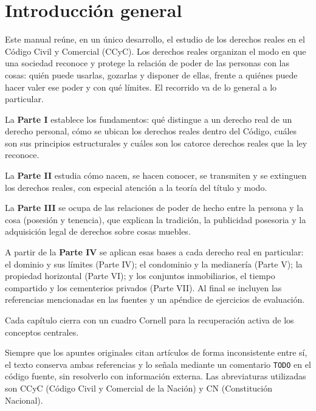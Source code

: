 \documentclass[12pt,oneside]{book}
\begin{document}
\mainmatter

\chapter*{Introducción general}

Este manual reúne, en un único desarrollo, el estudio de los derechos reales en el Código Civil y Comercial (CCyC). Los derechos reales organizan el modo en que una sociedad reconoce y protege la relación de poder de las personas con las cosas: quién puede usarlas, gozarlas y disponer de ellas, frente a quiénes puede hacer valer ese poder y con qué límites. El recorrido va de lo general a lo particular.

La \textbf{Parte I} establece los fundamentos: qué distingue a un derecho real de un derecho personal, cómo se ubican los derechos reales dentro del Código, cuáles son sus principios estructurales y cuáles son los catorce derechos reales que la ley reconoce.

La \textbf{Parte II} estudia cómo nacen, se hacen conocer, se transmiten y se extinguen los derechos reales, con especial atención a la teoría del título y modo.

La \textbf{Parte III} se ocupa de las relaciones de poder de hecho entre la persona y la cosa (posesión y tenencia), que explican la tradición, la publicidad posesoria y la adquisición legal de derechos sobre cosas muebles.

A partir de la \textbf{Parte IV} se aplican esas bases a cada derecho real en particular: el dominio y sus límites (Parte IV); el condominio y la medianería (Parte V); la propiedad horizontal (Parte VI); y los conjuntos inmobiliarios, el tiempo compartido y los cementerios privados (Parte VII). Al final se incluyen las referencias mencionadas en las fuentes y un apéndice de ejercicios de evaluación.

Cada capítulo cierra con un cuadro Cornell para la recuperación activa de los conceptos centrales.

\begin{nota}
Siempre que los apuntes originales citan artículos de forma inconsistente entre sí, el texto conserva ambas referencias y lo señala mediante un comentario \texttt{TODO} en el código fuente, sin resolverlo con información externa. Las abreviaturas utilizadas son CCyC (Código Civil y Comercial de la Nación) y CN (Constitución Nacional).
\end{nota}
\end{document}

